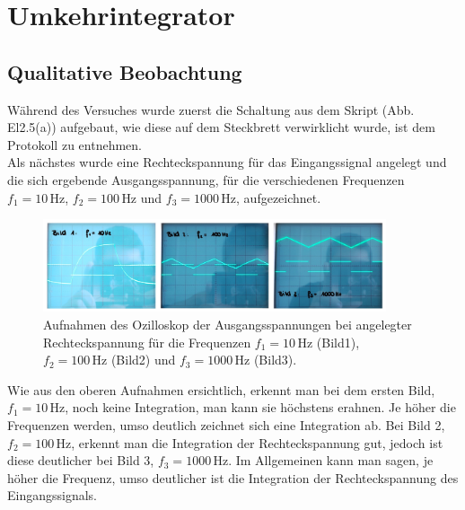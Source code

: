 \section{Umkehrintegrator}
\subsection{Qualitative Beobachtung}
Während des Versuches wurde zuerst die Schaltung aus dem Skript (Abb. El2.5(a)) aufgebaut, wie diese auf dem 
Steckbrett verwirklicht wurde, ist dem Protokoll zu entnehmen. \\
Als nächstes wurde eine Rechteckspannung für das Eingangssignal angelegt und die sich ergebende Ausgangsspannung, 
für die verschiedenen Frequenzen $f_1 = 10\,\text{Hz}$, $f_2 = 100\,\text{Hz}$ und $f_3 = 1000\,\text{Hz}$, 
aufgezeichnet. 

\begin{figure}[h]
    \begin{center}
        \includegraphics[width=0.9\textwidth]{Auswertung-Anna/Integration.jpg}
        \caption{Aufnahmen des Ozilloskop der Ausgangsspannungen bei angelegter Rechteckspannung für die Frequenzen $f_1 = 10\,\text{Hz}$ (Bild1), $f_2 = 100\,\text{Hz}$ (Bild2) und $f_3 = 1000\,\text{Hz}$ (Bild3).}
        \label{img:Integration}
    \end{center}
    \end{figure} 
    
Wie aus den oberen Aufnahmen ersichtlich, erkennt man
bei dem ersten Bild, $f_1 = 10\,\text{Hz}$, noch keine Integration, man
kann sie höchstens erahnen. Je höher die Frequenzen werden,
umso deutlich zeichnet sich eine Integration ab. Bei Bild 2, 
$f_2 = 100\,\text{Hz}$, erkennt man die Integration der Rechteckspannung gut, jedoch ist
diese deutlicher bei Bild 3,  $f_3 = 1000\,\text{Hz}$. 
Im Allgemeinen kann man sagen, je höher die Frequenz, umso deutlicher ist
die Integration der Rechteckspannung des Eingangssignals.
\newpage
